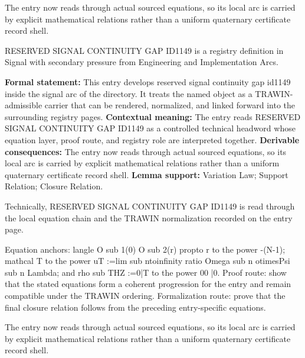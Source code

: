 The entry now reads through actual sourced equations, so its local arc is carried by explicit mathematical relations rather than a uniform quaternary certificate record shell.
\clearpage


\begingroup\small
{}
RESERVED SIGNAL CONTINUITY GAP ID1149 is a registry definition in Signal with secondary pressure from Engineering and Implementation Arcs.

\begingroup\footnotesize\setlength{\emergencystretch}{3em}\sloppy
\textbf{Formal statement:} This entry develops reserved signal continuity gap id1149 inside the signal arc of the directory. It treats the named object as a TRAWIN-admissible carrier that can be rendered, normalized, and linked forward into the surrounding registry pages. \textbf{Contextual meaning:} The entry reads RESERVED SIGNAL CONTINUITY GAP ID1149 as a controlled technical headword whose equation layer, proof route, and registry role are interpreted together. \textbf{Derivable consequences:} The entry now reads through actual sourced equations, so its local arc is carried by explicit mathematical relations rather than a uniform quaternary certificate record shell. \textbf{Lemma support:} Variation Law; Support Relation; Closure Relation.\par
\endgroup

Technically, RESERVED SIGNAL CONTINUITY GAP ID1149 is read through the local equation chain and the TRAWIN normalization recorded on the entry page.

Equation anchors: langle O sub 1(0) O sub 2(r) propto r to the power -(N-1); mathcal T to the power uT :=lim sub ntoinfinity ratio Omega sub n otimesPsi sub n Lambda; and rho sub THZ :=0|T to the power 00 |0. Proof route: show that the stated equations form a coherent progression for the entry and remain compatible under the TRAWIN ordering. Formalization route: prove that the final closure relation follows from the preceding entry-specific equations.

The entry now reads through actual sourced equations, so its local arc is carried by explicit mathematical relations rather than a uniform quaternary certificate record shell.
\endgroup

